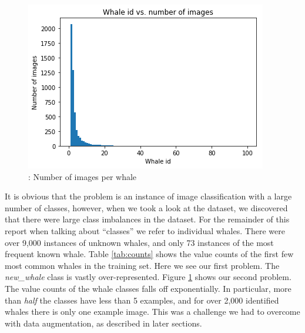 \begin{figure}[ht]
	\centering
	\includegraphics[width=.6\textwidth]{images/whale_frequency.png}
	\caption{\label{fig:whalefreq}: Number of images per whale}
\end{figure}

It is obvious that the problem is an instance of image classification with a large number of classes, however, when we took a look at the dataset, we discovered that there were large class imbalances in the dataset. For the remainder of this report when talking about ``classes'' we refer to individual whales. There were over 9,000 instances of unknown whales, and only 73 instances of the most frequent known whale. Table \ref{tab:counts} shows the value counts of the first few most common whales in the training set. Here we see our first problem. The \textit{new\_whale} class is vastly over-represented. Figure \ref{fig:whalefreq} shows our second problem. The value counts of the whale classes falls off exponentially. In particular, more than \textit{half} the classes have less than 5 examples, and for over 2,000 identified whales there is only one example image. This was a challenge we had to overcome with data augmentation, as described in later sections.\\

